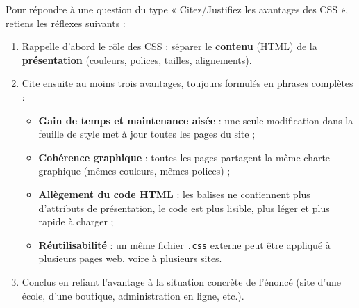 \documentclass[11pt]{article}
\newcommand{\cle}[1]{{\popxbold\color{popdark}#1}}
\begin{document}
\begin{methode}
Pour répondre à une question du type « Citez/Justifiez les avantages des CSS », retiens les réflexes suivants :
\begin{enumerate}
  \item Rappelle d'abord le \cle{rôle} des CSS : séparer le \textbf{contenu} (HTML) de la \textbf{présentation} (couleurs, polices, tailles, alignements).
  \item Cite ensuite au moins trois avantages, toujours formulés en phrases complètes :
  \begin{itemize}
    \item \textbf{Gain de temps et maintenance aisée} : une seule modification dans la feuille de style met à jour toutes les pages du site ;
    \item \textbf{Cohérence graphique} : toutes les pages partagent la même charte graphique (mêmes couleurs, mêmes polices) ;
    \item \textbf{Allègement du code HTML} : les balises ne contiennent plus d'attributs de présentation, le code est plus lisible, plus léger et plus rapide à charger ;
    \item \textbf{Réutilisabilité} : un même fichier \texttt{.css} externe peut être appliqué à plusieurs pages web, voire à plusieurs sites.
  \end{itemize}
  \item Conclus en reliant l'avantage à la situation concrète de l'énoncé (site d'une école, d'une boutique, administration en ligne, etc.).
\end{enumerate}
\end{methode}
\end{document}
